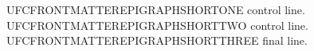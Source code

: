 UFCFRONTMATTEREPIGRAPHSHORTONE control line.\\
UFCFRONTMATTEREPIGRAPHSHORTTWO control line.\\
UFCFRONTMATTEREPIGRAPHSHORTTHREE final line.

